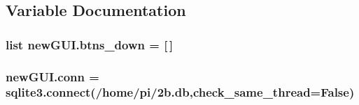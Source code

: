 \subsection{Variable Documentation}
\subsubsection[{\texorpdfstring{btns\+\_\+down}{btns_down}}]{\setlength{\rightskip}{0pt plus 5cm}list new\+G\+U\+I.\+btns\+\_\+down = \mbox{[}$\,$\mbox{]}}\hypertarget{namespacenewGUI_a63d65d01529f766bc8902211966856f8}{}\label{namespacenewGUI_a63d65d01529f766bc8902211966856f8}
\subsubsection[{\texorpdfstring{conn}{conn}}]{\setlength{\rightskip}{0pt plus 5cm}new\+G\+U\+I.\+conn = sqlite3.\+connect(\textquotesingle{}/home/pi/2b.\+db\textquotesingle{},check\+\_\+same\+\_\+thread=\+False)}\hypertarget{namespacenewGUI_a91dbb31105fb358875b6fa3553cab079}{}\label{namespacenewGUI_a91dbb31105fb358875b6fa3553cab079}
